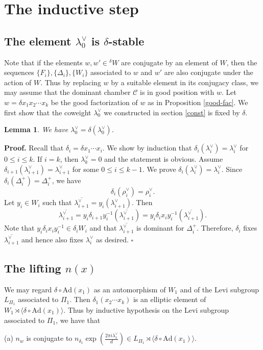 \documentclass[10pt,leqno]{article}
\newtheorem{lemma}[equation]{Lemma}
\newcommand{\qed}{\hfill $\square$ \medskip}
\newenvironment{proof}[1][Proof]{\noindent\textbf{#1.} }{\qed}
\newcommand{\Ad}{\text{Ad}}
\newcommand{\caC}{\mathcal C}
\renewcommand{\sec}[1]{\section{#1}
\renewcommand{\theequation}{\thesection.\arabic{equation}}
  \setcounter{equation}{0}}
\def\le{\leqslant}
\def\d{\delta}
\def\D{\Delta}
\def\l{\lambda}
\renewcommand{\sec}[1]{\section{#1}
\renewcommand{\theequation}{\thesection.\arabic{equation}}
  \setcounter{equation}{0}}
\begin{document}
\sec{The inductive step}

\subsection{The element $\l_0^\vee$ is $\d$-stable} Note that if the elements $w, w' \in {}^\d W$ are conjugate by an element of $W$, then the sequences $\{F_i\}, \{\D_i\}, \{W_i\}$ associated to $w$ and $w'$ are also conjugate under the action of $W$. Thus by replacing $w$ by a suitable element in its conjugacy class, we may assume that the dominant chamber $\caC$ is in good position with $w$. Let $w=\d x_1 x_2 \cdots x_k$ be the good factorization of $w$ as in Proposition \ref{good-fac}. We first show that the coweight $\l_0^\vee$ we constructed in section \ref{const} is fixed by $\d$.

\begin{lemma} \label{dom}
	We have $\l_0^\vee = \d(\l_0^\vee)$.
\end{lemma}
\begin{proof}
    Recall that $\d_i=\d x_1 \cdots x_{i}$. We show by induction that $\d_{i}(\l^\vee_{i})=\l^\vee_{i}$ for $0 \le i \le k$. If $i=k$, then $\l_k^\vee = 0$ and the statement is obvious. Assume $\d_{i+1}(\l_{i+1}^\vee) = \l_{i+1}^\vee$ for some $0 \le i \le k-1$. We prove $\d_i(\l_i^\vee)=\l_i^\vee$. Since $\d_{i}(\D_i^+)=\D_i^+$, we have $$\d_{i}(\rho_i^\vee)=\rho_i^\vee.$$ Let $y_i \in W_i$ such that $\overline{\l_{i+1}^\vee} = y_i(\l_{i+1}^\vee)$. Then $$\overline{\l_{i+1}^\vee}=y_i \d_{i+1} y_i^{-1} (\overline{\l_{i+1}^\vee}) =y_i \d_i x_i y_i^{-1} (\overline{\l_{i+1}^\vee}).$$ Note that $y_i \d_i x_i y_i^{-1} \in \d_i W_i$ and that $\overline{\l_{i+1}^\vee}$ is dominant for $\D_i^+$. Therefore, $\d_i$ fixes $\overline{\l_{i+1}^\vee}$ and hence also fixes $\l_i^\vee$ as desired.
\end{proof}

\subsection{The lifting $n(x)$}\label{setup}

We may regard $\d \circ \Ad(x_1)$ as an automorphism of $W_1$ and of the Levi subgroup $L_{\Pi_1}$ associated to $\Pi_1$. Then $\d_1 (x_2 \cdots x_k)$ is an elliptic element of $W_1 \rtimes \langle\d \circ \Ad(x_1)\rangle$. Thus by inductive hypothesis on the Levi subgroup associated to $\Pi_1$, we have that

(a) $n_w$ is conjugate to $n_{\d_1} \exp(\frac{2 \pi i \l^\vee_1}{d}) \in L_{\Pi_1} \rtimes \langle\d \circ \Ad(x_1)\rangle$.
\end{document}
